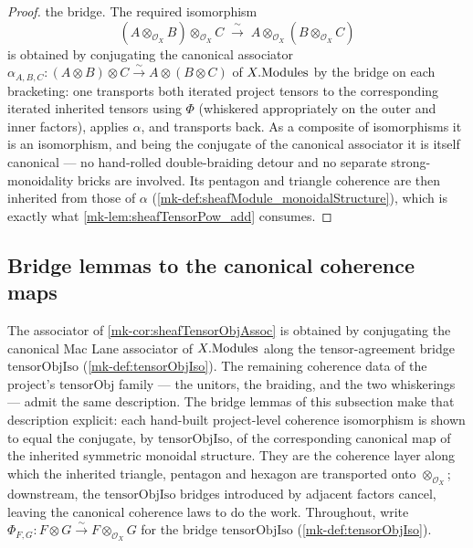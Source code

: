 \begin{proof}
  \leanok
  the bridge. The required isomorphism
  \[
    (A \otimes_{\mathcal{O}_X} B) \otimes_{\mathcal{O}_X} C
      \;\xrightarrow{\ \sim\ }\;
      A \otimes_{\mathcal{O}_X} (B \otimes_{\mathcal{O}_X} C)
  \]
  is obtained by conjugating the canonical associator
  \(\alpha_{A,B,C} : (A \otimes B) \otimes C \xrightarrow{\sim}
  A \otimes (B \otimes C)\) of \(X.\mathrm{Modules}\) by the bridge on each bracketing:
  one transports both iterated project tensors to the corresponding iterated
  inherited tensors using \(\Phi\) (whiskered appropriately on the outer and inner
  factors), applies \(\alpha\), and transports back. As a composite of
  isomorphisms it is an isomorphism, and being the conjugate of the canonical
  associator it is itself canonical --- no hand-rolled double-braiding detour and
  no separate strong-monoidality bricks are involved. Its pentagon and triangle
  coherence are then inherited from those of \(\alpha\)
  (\ref{mk-def:sheafModule_monoidalStructure}), which is exactly what
  \ref{mk-lem:sheafTensorPow_add} consumes.
\end{proof}


\subsection{Bridge lemmas to the canonical coherence maps}

The associator of \ref{mk-cor:sheafTensorObjAssoc} is obtained by conjugating the
canonical Mac Lane associator of \(X.\mathrm{Modules}\) along the tensor-agreement bridge
\(\mathrm{tensorObjIso}\) (\ref{mk-def:tensorObjIso}). The remaining coherence data
of the project's \(\mathrm{tensorObj}\) family --- the unitors, the braiding, and
the two whiskerings --- admit the same description. The bridge lemmas of this
subsection make that description explicit: each hand-built project-level
coherence isomorphism is shown to equal the conjugate, by
\(\mathrm{tensorObjIso}\), of the corresponding canonical map of the inherited
symmetric monoidal structure. They are the coherence layer along
which the inherited triangle, pentagon and hexagon are transported onto
\(\otimes_{\mathcal{O}_X}\); downstream, the \(\mathrm{tensorObjIso}\) bridges
introduced by adjacent factors cancel, leaving the canonical coherence laws to do
the work. Throughout, write \(\Phi_{F,G} : F \otimes G \xrightarrow{\sim}
F \otimes_{\mathcal{O}_X} G\) for the bridge \(\mathrm{tensorObjIso}\)
(\ref{mk-def:tensorObjIso}).

